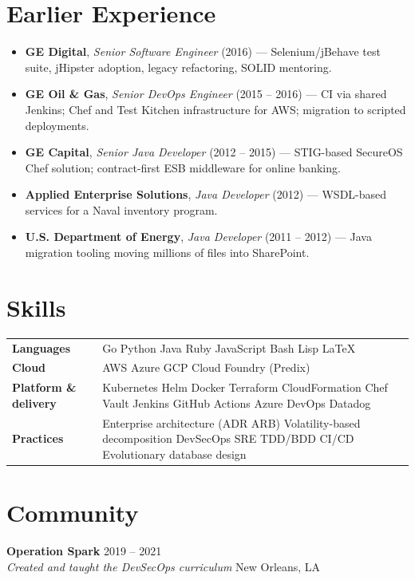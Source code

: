 \documentclass[letterpaper,10pt]{article}
\newenvironment{clients}
  {\begin{itemize}[leftmargin=13pt, itemsep=3pt, topsep=3pt,
                   label=\textcolor{gold}{\textbullet}]}
  {\end{itemize}}
\newcommand{\pastrole}[4]{%
  \item \textbf{#1}, \textit{#2} {\small\color{muted}(#3)} — #4}
\newcommand{\skillrow}[2]{\textbf{#1} & #2 \\[3pt]}
\newcommand{\sep}{\;\textperiodcentered\;}
\begin{document}
\section{Earlier Experience}
\begin{clients}
  \pastrole{GE Digital}{Senior Software Engineer}{2016}{Selenium/jBehave
    test suite, jHipster adoption, legacy refactoring, SOLID mentoring.}
  \pastrole{GE Oil \& Gas}{Senior DevOps Engineer}{2015 -- 2016}{CI via
    shared Jenkins; Chef and Test Kitchen infrastructure for AWS;
    migration to scripted deployments.}
  \pastrole{GE Capital}{Senior Java Developer}{2012 -- 2015}{STIG-based
    SecureOS Chef solution; contract-first ESB middleware for online
    banking.}
  \pastrole{Applied Enterprise Solutions}{Java Developer}{2012}
    {WSDL-based services for a Naval inventory program.}
  \pastrole{U.S. Department of Energy}{Java Developer}{2011 -- 2012}
    {Java migration tooling moving millions of files into SharePoint.}
\end{clients}

\section{Skills}
\begin{tabularx}{\textwidth}{@{}p{1.55in}X@{}}
  \skillrow{Languages}{Go \sep Python \sep Java \sep Ruby \sep JavaScript
    \sep Bash \sep Lisp \sep \LaTeX}
  \skillrow{Cloud}{AWS \sep Azure \sep GCP \sep Cloud Foundry (Predix)}
  \skillrow{Platform \& delivery}{Kubernetes \sep Helm \sep Docker \sep
    Terraform \sep CloudFormation \sep Chef \sep Vault \sep Jenkins \sep
    GitHub Actions \sep Azure DevOps \sep Datadog}
  \skillrow{Practices}{Enterprise architecture (ADR \sep ARB) \sep
    Volatility-based decomposition \sep DevSecOps \sep SRE \sep TDD/BDD
    \sep CI/CD \sep Evolutionary database design}
\end{tabularx}

\section{Community}
\textbf{Operation Spark} \hfill {\small\color{muted}2019 -- 2021}\\
\textit{Created and taught the DevSecOps curriculum} \hfill {\small\color{muted}New Orleans, LA}
\end{document}
